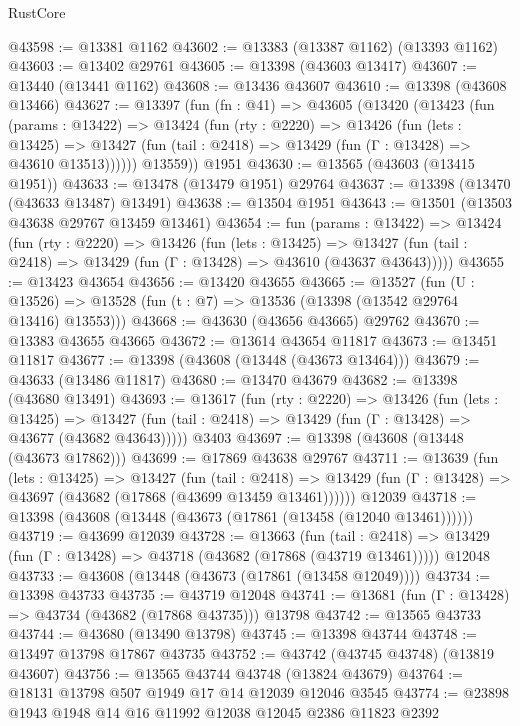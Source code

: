 \begin{lexlean}{RustCore}
\begin{coremodule}
@43598 := @13381 @1162
@43602 := @13383 (@13387 @1162) (@13393 @1162)
@43603 := @13402 @29761
@43605 := @13398 (@43603 @13417)
@43607 := @13440 (@13441 @1162)
@43608 := @13436 @43607
@43610 := @13398 (@43608 @13466)
@43627 := @13397
    (fun (fn : @41) =>
    @43605
      (@13420
        (@13423
          (fun (params : @13422) =>
          @13424
            (fun (rty : @2220) =>
            @13426
              (fun (lets : @13425) =>
              @13427 (fun (tail : @2418) => @13429 (fun (Γ : @13428) => @43610 @13513))))))
        @13559))
    @1951
@43630 := @13565 (@43603 (@13415 @1951))
@43633 := @13478 (@13479 @1951) @29764
@43637 := @13398 (@13470 (@43633 @13487) @13491)
@43638 := @13504 @1951
@43643 := @13501 (@13503 @43638 @29767 @13459 @13461)
@43654 := fun (params : @13422) =>
  @13424
    (fun (rty : @2220) =>
    @13426
      (fun (lets : @13425) =>
      @13427 (fun (tail : @2418) => @13429 (fun (Γ : @13428) => @43610 (@43637 @43643)))))
@43655 := @13423 @43654
@43656 := @13420 @43655
@43665 := @13527
    (fun (U : @13526) => @13528 (fun (t : @7) => @13536 (@13398 (@13542 @29764 @13416) @13553)))
@43668 := @43630 (@43656 @43665) @29762
@43670 := @13383 @43655 @43665
@43672 := @13614 @43654 @11817
@43673 := @13451 @11817
@43677 := @13398 (@43608 (@13448 (@43673 @13464)))
@43679 := @43633 (@13486 @11817)
@43680 := @13470 @43679
@43682 := @13398 (@43680 @13491)
@43693 := @13617
    (fun (rty : @2220) =>
    @13426
      (fun (lets : @13425) =>
      @13427 (fun (tail : @2418) => @13429 (fun (Γ : @13428) => @43677 (@43682 @43643)))))
    @3403
@43697 := @13398 (@43608 (@13448 (@43673 @17862)))
@43699 := @17869 @43638 @29767
@43711 := @13639
    (fun (lets : @13425) =>
    @13427
      (fun (tail : @2418) =>
      @13429 (fun (Γ : @13428) => @43697 (@43682 (@17868 (@43699 @13459 @13461))))))
    @12039
@43718 := @13398 (@43608 (@13448 (@43673 (@17861 (@13458 (@12040 @13461))))))
@43719 := @43699 @12039
@43728 := @13663
    (fun (tail : @2418) => @13429 (fun (Γ : @13428) => @43718 (@43682 (@17868 (@43719 @13461)))))
    @12048
@43733 := @43608 (@13448 (@43673 (@17861 (@13458 @12049))))
@43734 := @13398 @43733
@43735 := @43719 @12048
@43741 := @13681 (fun (Γ : @13428) => @43734 (@43682 (@17868 @43735))) @13798
@43742 := @13565 @43733
@43744 := @43680 (@13490 @13798)
@43745 := @13398 @43744
@43748 := @13497 @13798 @17867 @43735
@43752 := @43742 (@43745 @43748) (@13819 @43607)
@43756 := @13565 @43744 @43748 (@13824 @43679)
@43764 := @18131 @13798 @507 @1949 @17 @14 @12039 @12046 @3545
@43774 := @23898 @1943 @1948 @14 @16 @11992 @12038 @12045 @2386 @11823 @2392

\end{coremodule}
\end{lexlean}
